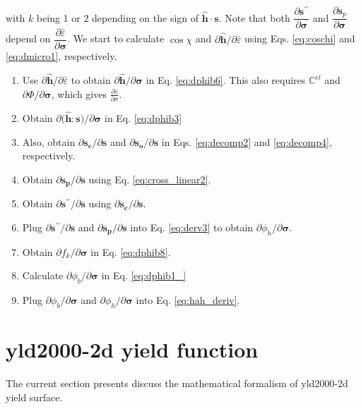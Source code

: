 \documentclass[12pt]{amsart}
\begin{document}
with $k$ being 1 or 2 depending on the sign of $\hat{\mathbf{h}}\cdot\mathbf{s}$.
Note that both $\dfrac{\partial\mathbf{s}^{\prime\prime}}{\partial\mathbf{\sigma}}$ and $\dfrac{\partial\mathbf{s}_p}{\partial\mathbf{\sigma}}$ depend on $\dfrac{\partial\bar{\varepsilon}}{\partial\mathbf{\sigma}}$.
 We start to calculate $\cos\chi$ and $\partial \hat{\mathbf{h}}/\partial \bar{\varepsilon}$ using Eqs. \ref{eq:coschi} and \ref{eq:dmicro1}, respectively.
\begin{enumerate}
\item Use $\partial \hat{\mathbf{h}}/\partial \bar{\varepsilon}$ to obtain $\partial \hat{\mathbf{h}}/\partial \mathbf{\sigma}$ in Eq. \ref{eq:dphib6}. This also requires $\mathbb{C}^{el}$ and $\partial\Phi/\partial\mathbf{\sigma}$, which gives $\frac{\partial\bar{\varepsilon}}{\partial\sigma}$.
\item Obtain $\partial\big(\hat{\mathbf{h}}:\mathbf{s}\big)/\partial \mathbf{\sigma}$ in Eq. \ref{eq:dphib3}
\item Also, obtain $\partial \mathbf{s_c}/\partial \mathbf{s}$ and $\partial \mathbf{s_o}/\partial\mathbf{s}$ in Eqs. \ref{eq:decomp2} and \ref{eq:decomp4}, respectively.
\item Obtain $\partial \mathbf{s_p}/\partial\mathbf{s}$ using Eq. \ref{eq:cross_linear2}.
\item Obtain $\partial\mathbf{s}^{\prime\prime}/\partial\mathbf{s}$ using $\partial \mathbf{s_c}/\partial \mathbf{s}$.
\item Plug $\partial\mathbf{s}^{\prime\prime}/\partial\mathbf{s}$ and  $\partial \mathbf{s_p}/\partial\mathbf{s}$ into Eq. \ref{eq:derv3} to obtain $\partial\phi_h/\partial\mathbf{\sigma}$.
\item Obtain $\partial f_k/\partial \mathbf{\sigma}$ in Eq. \ref{eq:dphib8}.
\item Calculate $\partial \phi_b/\partial \mathbf{\sigma}$ in Eq. \ref{eq:dphib1_}
\item Plug $\partial \phi_b/\partial\mathbf{\sigma}$ and $\partial\phi_h/\partial\mathbf{\sigma}$ into Eq. \ref{eq:hah_deriv}.
\end{enumerate}


\newpage
\section{yld2000-2d yield function}
The current section presents discuss the mathematical formalism of yld2000-2d yield surface.
\end{document}
